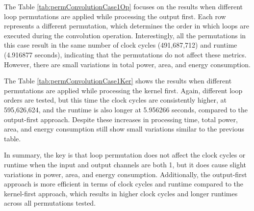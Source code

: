 The Table \ref{tab:permConvolutionCase1Op} focuses on the results when different loop permutations are applied while processing the output first. Each row represents a different permutation, which determines the order in which loops are executed during the convolution operation. Interestingly, all the permutations in this case result in the same number of clock cycles (491,687,712) and runtime (4.916877 seconds), indicating that the permutations do not affect these metrics. However, there are small variations in total power, area, and energy consumption.
\\

\begin{table}[H]
\centering
\caption{Kernel-first permutation}
\label{tab:permConvolutionCase1Ker}
\end{table}

The Table \ref{tab:permConvolutionCase1Ker} shows the results when different permutations are applied while processing the kernel first. Again, different loop orders are tested, but this time the clock cycles are consistently higher, at 595,626,624, and the runtime is also longer at 5.956266 seconds, compared to the output-first approach. Despite these increases in processing time, total power, area, and energy consumption still show small variations similar to the previous table.

In summary, the key is that loop permutation does not affect the clock cycles or runtime when the input and output channels are both 1, but it does cause slight variations in power, area, and energy consumption. Additionally, the output-first approach is more efficient in terms of clock cycles and runtime compared to the kernel-first approach, which results in higher clock cycles and longer runtimes across all permutations tested.

